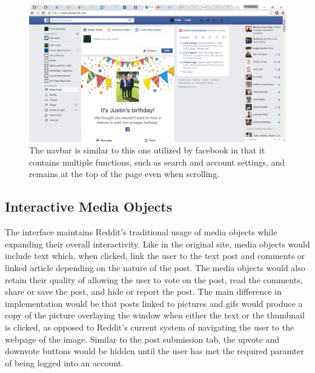 \documentclass{article}
\begin{document}
\begin{figure}[H]
\begin{center}
\includegraphics[width=1\textwidth]{navbar.png}
\caption{The navbar is similar to this one utilized by facebook in that it contains multiple functions, such as search and account settings, and remains at the top of the page even when scrolling.}
\end{center}
\end{figure}

\subsection{Interactive Media Objects} The interface maintains Reddit's traditional usage of media objects while expanding their overall interactivity. Like in the original site, media objects would include text which, when clicked, link the user to the text post and comments or linked article depending on the nature of the post. The media objects would also retain their quality of allowing the user to vote on the post, read the comments, share or save the post, and hide or report the post. The main difference in implementation would be that posts linked to pictures and gifs would produce a copy of the picture overlaying the window when either the text or the thumbnail is clicked, as opposed to Reddit's current system of navigating the user to the webpage of the image. Similar to the post submission tab, the upvote and downvote buttons would be hidden until the user has met the required paramter of being logged into an account.
\end{document}
